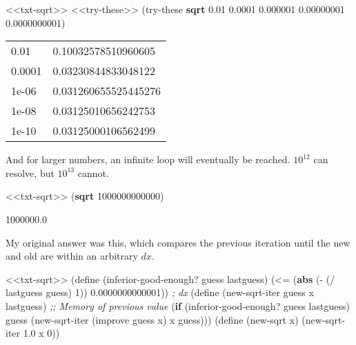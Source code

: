 \documentclass[
]{article}
\newenvironment{Shaded}{}{}
\newcommand{\CommentTok}[1]{\textcolor[rgb]{0.38,0.63,0.69}{\textit{#1}}}
\newcommand{\DecValTok}[1]{\textcolor[rgb]{0.25,0.63,0.44}{#1}}
\newcommand{\ExtensionTok}[1]{#1}
\newcommand{\FloatTok}[1]{\textcolor[rgb]{0.25,0.63,0.44}{#1}}
\newcommand{\FunctionTok}[1]{\textcolor[rgb]{0.02,0.16,0.49}{#1}}
\newcommand{\KeywordTok}[1]{\textcolor[rgb]{0.00,0.44,0.13}{\textbf{#1}}}
\newcommand{\NormalTok}[1]{#1}
\newcommand{\OperatorTok}[1]{\textcolor[rgb]{0.40,0.40,0.40}{#1}}
\begin{document}
\hypertarget{EX1-7-t1}{%
\label{EX1-7-t1}}%
\begin{Shaded}
\begin{Highlighting}[]
\NormalTok{\textless{}\textless{}txt{-}sqrt\textgreater{}\textgreater{}}
\NormalTok{\textless{}\textless{}try{-}these\textgreater{}\textgreater{}}
\NormalTok{(try{-}these }\KeywordTok{sqrt} \FloatTok{0.01} \FloatTok{0.0001} \FloatTok{0.000001} \FloatTok{0.00000001} \FloatTok{0.0000000001}\NormalTok{)}
\end{Highlighting}
\end{Shaded}

\begin{longtable}[]{@{}ll@{}}
\toprule
\endhead
0.01 & 0.10032578510960605 \\
0.0001 & 0.03230844833048122 \\
1e-06 & 0.031260655525445276 \\
1e-08 & 0.03125010656242753 \\
1e-10 & 0.03125000106562499 \\
\bottomrule
\end{longtable}

And for larger numbers, an infinite loop will eventually be reached.
\(10^{12}\) can resolve, but \(10^{13}\) cannot.

\begin{Shaded}
\begin{Highlighting}[]
\NormalTok{\textless{}\textless{}txt{-}sqrt\textgreater{}\textgreater{}}
\NormalTok{(}\KeywordTok{sqrt} \DecValTok{1000000000000}\NormalTok{)}
\end{Highlighting}
\end{Shaded}

1000000.0

My original answer was this, which compares the previous iteration until
the new and old are within an arbitrary \(dx\).

\hypertarget{inferior-good-enough}{%
\label{inferior-good-enough}}%
\begin{Shaded}
\begin{Highlighting}[]
\NormalTok{\textless{}\textless{}txt{-}sqrt\textgreater{}\textgreater{}}
\NormalTok{(}\ExtensionTok{define}\FunctionTok{ }\NormalTok{(inferior{-}good{-}enough? guess lastguess)}
\NormalTok{  (}\OperatorTok{\textless{}=}
\NormalTok{   (}\KeywordTok{abs}\NormalTok{ (}\OperatorTok{{-}}
\NormalTok{         (}\OperatorTok{/}\NormalTok{ lastguess guess)}
         \DecValTok{1}\NormalTok{))}
   \FloatTok{0.0000000000001}\NormalTok{)) }\CommentTok{; dx}
\NormalTok{(}\ExtensionTok{define}\FunctionTok{ }\NormalTok{(new{-}sqrt{-}iter guess x lastguess) }\CommentTok{;; Memory of previous value}
\NormalTok{  (}\KeywordTok{if}\NormalTok{ (inferior{-}good{-}enough? guess lastguess)}
\NormalTok{      guess}
\NormalTok{      (new{-}sqrt{-}iter (improve guess x) x guess)))}
\NormalTok{(}\ExtensionTok{define}\FunctionTok{ }\NormalTok{(new{-}sqrt x)}
\NormalTok{  (new{-}sqrt{-}iter }\FloatTok{1.0}\NormalTok{ x }\DecValTok{0}\NormalTok{))}
\end{Highlighting}
\end{Shaded}
\end{document}
